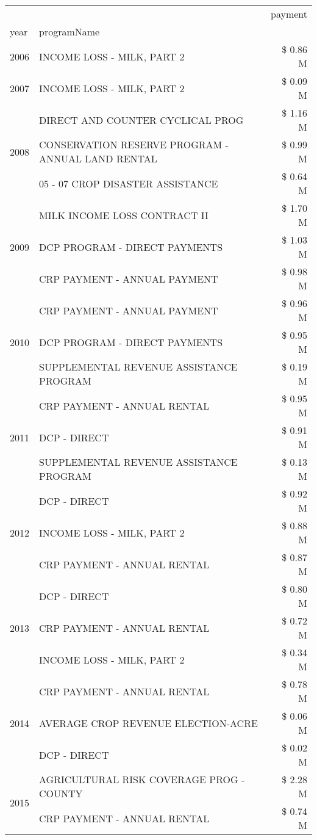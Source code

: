 \begin{tabular}{llr}
\toprule
 &  & payment \\
year & programName &  \\
\midrule
2006 & INCOME LOSS - MILK, PART 2 & \$ 0.86 M \\
\cline{1-3}
2007 & INCOME LOSS - MILK, PART 2 & \$ 0.09 M \\
\cline{1-3}
\multirow[t]{3}{*}{2008} & DIRECT AND COUNTER CYCLICAL PROG & \$ 1.16 M \\
 & CONSERVATION RESERVE PROGRAM - ANNUAL LAND RENTAL & \$ 0.99 M \\
 & 05 - 07 CROP DISASTER ASSISTANCE & \$ 0.64 M \\
\cline{1-3}
\multirow[t]{3}{*}{2009} & MILK INCOME LOSS CONTRACT II & \$ 1.70 M \\
 & DCP PROGRAM - DIRECT PAYMENTS & \$ 1.03 M \\
 & CRP PAYMENT - ANNUAL PAYMENT & \$ 0.98 M \\
\cline{1-3}
\multirow[t]{3}{*}{2010} & CRP PAYMENT - ANNUAL PAYMENT & \$ 0.96 M \\
 & DCP PROGRAM - DIRECT PAYMENTS & \$ 0.95 M \\
 & SUPPLEMENTAL REVENUE ASSISTANCE PROGRAM & \$ 0.19 M \\
\cline{1-3}
\multirow[t]{3}{*}{2011} & CRP PAYMENT - ANNUAL RENTAL & \$ 0.95 M \\
 & DCP - DIRECT & \$ 0.91 M \\
 & SUPPLEMENTAL REVENUE ASSISTANCE PROGRAM & \$ 0.13 M \\
\cline{1-3}
\multirow[t]{3}{*}{2012} & DCP - DIRECT & \$ 0.92 M \\
 & INCOME LOSS - MILK, PART 2 & \$ 0.88 M \\
 & CRP PAYMENT - ANNUAL RENTAL & \$ 0.87 M \\
\cline{1-3}
\multirow[t]{3}{*}{2013} & DCP - DIRECT & \$ 0.80 M \\
 & CRP PAYMENT - ANNUAL RENTAL & \$ 0.72 M \\
 & INCOME LOSS - MILK, PART 2 & \$ 0.34 M \\
\cline{1-3}
\multirow[t]{3}{*}{2014} & CRP PAYMENT - ANNUAL RENTAL & \$ 0.78 M \\
 & AVERAGE CROP REVENUE ELECTION-ACRE & \$ 0.06 M \\
 & DCP - DIRECT & \$ 0.02 M \\
\cline{1-3}
\multirow[t]{3}{*}{2015} & AGRICULTURAL RISK COVERAGE PROG - COUNTY & \$ 2.28 M \\
 & CRP PAYMENT - ANNUAL RENTAL & \$ 0.74 M \\

\end{tabular}
